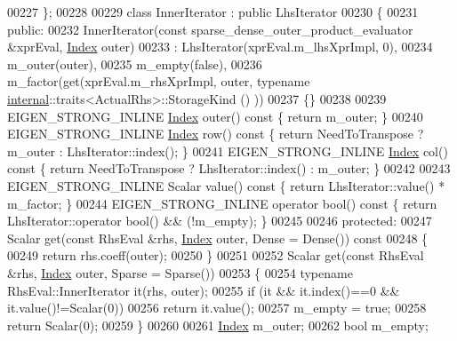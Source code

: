\begin{DoxyCode}
00227   \};
00228   
00229   \textcolor{keyword}{class }InnerIterator : \textcolor{keyword}{public} LhsIterator
00230   \{
00231   \textcolor{keyword}{public}:
00232     InnerIterator(\textcolor{keyword}{const} sparse\_dense\_outer\_product\_evaluator &xprEval, \hyperlink{namespace_eigen_a62e77e0933482dafde8fe197d9a2cfde}{Index} outer)
00233       : LhsIterator(xprEval.m\_lhsXprImpl, 0),
00234         m\_outer(outer),
00235         m\_empty(false),
00236         m\_factor(get(xprEval.m\_rhsXprImpl, outer, typename \hyperlink{namespaceinternal}{internal}::traits<ActualRhs>::StorageKind
      () ))
00237     \{\}
00238     
00239     EIGEN\_STRONG\_INLINE \hyperlink{namespace_eigen_a62e77e0933482dafde8fe197d9a2cfde}{Index} outer()\textcolor{keyword}{ const }\{ \textcolor{keywordflow}{return} m\_outer; \}
00240     EIGEN\_STRONG\_INLINE \hyperlink{namespace_eigen_a62e77e0933482dafde8fe197d9a2cfde}{Index} row()\textcolor{keyword}{   const }\{ \textcolor{keywordflow}{return} NeedToTranspose ? m\_outer : LhsIterator::index();
       \}
00241     EIGEN\_STRONG\_INLINE \hyperlink{namespace_eigen_a62e77e0933482dafde8fe197d9a2cfde}{Index} col()\textcolor{keyword}{   const }\{ \textcolor{keywordflow}{return} NeedToTranspose ? LhsIterator::index() : m\_outer;
       \}
00242 
00243     EIGEN\_STRONG\_INLINE Scalar value()\textcolor{keyword}{ const }\{ \textcolor{keywordflow}{return} LhsIterator::value() * m\_factor; \}
00244     EIGEN\_STRONG\_INLINE \textcolor{keyword}{operator} bool()\textcolor{keyword}{ const }\{ \textcolor{keywordflow}{return} LhsIterator::operator bool() && (!m\_empty); \}
00245     
00246   \textcolor{keyword}{protected}:
00247     Scalar \textcolor{keyword}{get}(\textcolor{keyword}{const} RhsEval &rhs, \hyperlink{namespace_eigen_a62e77e0933482dafde8fe197d9a2cfde}{Index} outer, Dense = Dense()) \textcolor{keyword}{const}
00248     \{
00249       \textcolor{keywordflow}{return} rhs.coeff(outer);
00250     \}
00251     
00252     Scalar \textcolor{keyword}{get}(\textcolor{keyword}{const} RhsEval &rhs, \hyperlink{namespace_eigen_a62e77e0933482dafde8fe197d9a2cfde}{Index} outer, Sparse = Sparse())
00253     \{
00254       \textcolor{keyword}{typename} RhsEval::InnerIterator it(rhs, outer);
00255       \textcolor{keywordflow}{if} (it && it.index()==0 && it.value()!=Scalar(0))
00256         \textcolor{keywordflow}{return} it.value();
00257       m\_empty = \textcolor{keyword}{true};
00258       \textcolor{keywordflow}{return} Scalar(0);
00259     \}
00260     
00261     \hyperlink{namespace_eigen_a62e77e0933482dafde8fe197d9a2cfde}{Index} m\_outer;
00262     \textcolor{keywordtype}{bool} m\_empty;

\end{DoxyCode}
